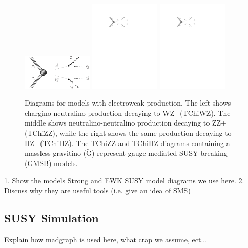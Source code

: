   \begin{figure}
  \begin{center}
    \includegraphics[width=0.3\textwidth]{figures/diagrams/TChiWZ.pdf} 
    \includegraphics[width=0.3\textwidth]{figures/diagrams/TChiZZ.pdf} 
    \includegraphics[width=0.3\textwidth]{figures/diagrams/TChiHZ.pdf} 
  \end{center}
  \caption{
    \label{sig:feynman_ewk} 
    Diagrams for models with electroweak production.
    The left shows chargino-neutralino production decaying to WZ+\MET (TChiWZ).
    The middle shows neutralino-neutralino production decaying to ZZ+\MET (TChiZZ),
    while the right shows the same production decaying to HZ+\MET (TChiHZ).
    The TChiZZ and TChiHZ diagrams containing a massless gravitino ($\tilde{\mathrm{G}}$) represent gauge mediated SUSY breaking (GMSB) models.
  }
\end{figure}

  1. Show the models Strong and EWK SUSY model diagrams we use here.
  2. Discuss why they are useful tools (i.e. give an idea of SMS)

  \subsection{SUSY Simulation} \label{sec:susy_simulation}
    Explain how madgraph is used here, what crap we assume, ect...

